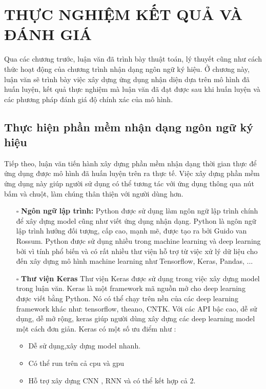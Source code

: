 \chapter{THỰC NGHIỆM KẾT QUẢ VÀ ĐÁNH GIÁ}
Qua các chương trước, luận văn đã trình bày thuật toán, lý thuyết cũng như cách thức hoạt động của chương trình nhận dạng ngôn ngữ ký hiệu. Ở chương này, luận văn sẽ trình bày việc xây dựng ứng dụng nhận diện dựa trên mô hình đã huấn luyện, kết quả thực nghiệm mà luận văn đã đạt được sau khi huấn luyện và các phương pháp đánh giá độ chính xác của mô hình.
\section{Thực hiện phần mềm nhận dạng ngôn ngữ ký hiệu}
Tiếp theo, luận văn tiến hành xây dựng phần mềm nhận dạng thời gian thực để ứng dụng được mô hình đã huấn luyện trên ra thực tế. Việc xây dựng phần mềm ứng dụng này giúp người sử dụng có thể tương tác với ứng dụng thông qua nút bấm và chuột, làm chúng thân thiện với người dùng hơn.
\begin{itemize}
\item[$\square$] \textbf{Ngôn ngữ lập trình: }
Python được sử dụng làm ngôn ngữ lập trình chính để xây dựng model cũng như viết ứng dụng nhận dạng. Python là ngôn ngữ lập trình hướng đối tượng, cấp cao, mạnh mẽ, được tạo ra bởi Guido van Rossum. Python được sử dụng nhiều trong machine learning và deep learning bởi vì tính phổ biến và có rất nhiều thư viện hỗ trợ từ việc xử lý dữ liệu cho đến xây dựng mô hình machine learning như Tensorflow, Keras, Pandas, ...
\item[$\square$] \textbf{Thư viện Keras}
Thư viện Keras được sử dụng trong việc xây dựng model trong luận văn. Keras là một framework mã nguồn mở cho deep learning được viết bằng Python. Nó có thể chạy trên nền của các deep learning framework khác như: tensorflow, theano, CNTK. Với các API bậc cao, dễ sử dụng, dễ mở rộng, keras giúp người dùng xây dựng các deep learning model một cách đơn giản. Keras có một số ưu điểm như :

	\begin{itemize}
	\item Dễ sử dụng,xây dựng model nhanh.
	\item Có thể run trên cả cpu và gpu
	\item Hỗ trợ xây dựng CNN , RNN và có thể kết hợp cả 2.
	\end{itemize}
\end{itemize}

